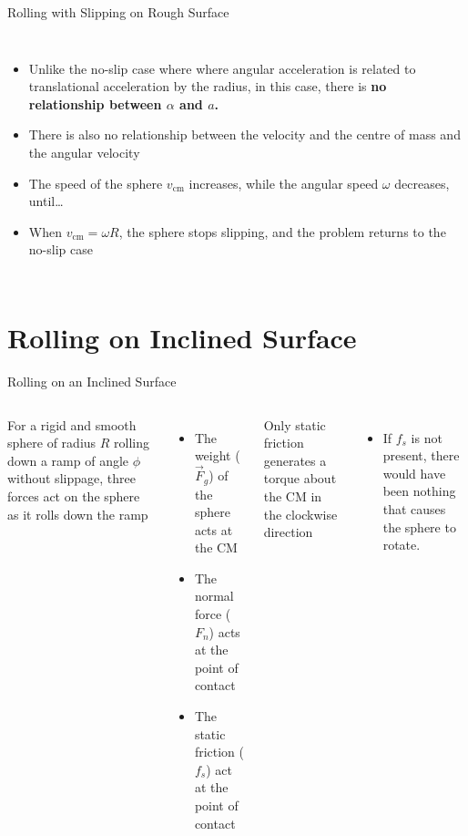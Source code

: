\documentclass[12pt,compress,aspectratio=169]{beamer}
\begin{document}
\begin{frame}{Rolling with Slipping on Rough Surface}
  \begin{columns}[T]
    

    \begin{itemize}
    \item Unlike the no-slip case where where angular acceleration is related
      to translational acceleration by the radius,
      in this case, there is \textbf{no relationship between $\alpha$ and $a$.}
    \item There is also no relationship between the velocity and the centre
      of mass and the angular velocity
    \item The speed of the sphere $v_\text{cm}$ increases, while the angular
      speed $\omega$ decreases, until\ldots
    \item When $v_\text{cm}=\omega R$, the sphere stops slipping, and the
      problem returns to the no-slip case
    \end{itemize}
  \end{columns}
\end{frame}



\section{Rolling on Inclined Surface}

\begin{frame}{Rolling on an Inclined Surface}
  \begin{columns}
    

    For a rigid and smooth sphere of radius $R$ rolling down a ramp of angle
    $\phi$ without slippage, three forces act on the sphere as it rolls down
    the ramp
    \begin{itemize}
    \item The weight ($\vec F_g$) of the sphere acts at the CM
    \item The normal force ($F_n$) acts at the point of contact
    \item The static friction ($f_s$) act at the point of contact
    \end{itemize}
    Only static friction generates a torque about the CM in the clockwise
    direction
    \begin{itemize}
    \item If $f_s$ is not present, there would have been nothing that causes
      the sphere to rotate.
    \end{itemize}
  \end{columns}
\end{frame}
\end{document}
